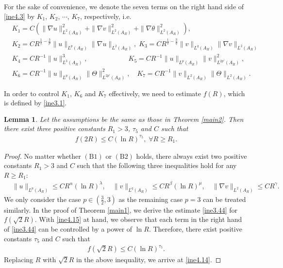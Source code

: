 \documentclass[11pt,reqno]{amsart}
\newtheorem{Lem}{Lemma}[section]
\numberwithin{Thm}{section}
\begin{document}
For the sake of convenience, we denote the seven terms on the right hand side of \eqref{ine4.3} by $K_1$, $K_2$, $\cdots$, $K_7$, respectively, i.e.
	\begin{align*}
		&K_1=C\left(\|\nabla u\|_{L^2(A_R)}^2+\|\nabla v\|_{L^2(A_R)}^2+\|\nabla \theta\|_{L^2(A_R)}^2\right),\\
        &K_2=CR^{\frac{1}{2}-\frac{3}{p}}\|u\|_{L^p(A_R)}\|\nabla u\|_{L^2(A_R)},\; K_3=CR^{\frac{1}{2}-\frac{3}{q}}\|v\|_{L^q(A_R)}\|\nabla v\|_{L^2(A_R)}\\
		&K_4=CR^{-1}\|u\|_{L^3(A_R)}^3,\quad \quad\quad \quad\quad \quad K_5=CR^{-1}\|u\|_{L^p(A_R)}\|v\|_{L^{2p'}(A_R)}^2,\\
		&K_6=CR^{-1}\|u\|_{L^p(A_R)}\|\Theta\|_{L^{2p'}(A_R)}^2,\quad K_7=CR^{-1}\|v\|_{L^2(A_R)}\|\Theta\|_{L^2(A_R)}.
	\end{align*}
	

In order to control $K_1$, $K_6$ and $K_7$ effectively, we need to estimate $f(R)$, which is defined by \eqref{ine3.1}.

\begin{Lem}\label{Lem4.3}
Let the assumptions be the same as those in {\rm Theorem \ref{main2}}. Then there exist three positive constants $R_1>3$, $\tau_5$ and $C$ such that
	\begin{align}\label{ine4.14}
		f(2R)\leq C(\ln R)^{\tau_5},\;\forall R\geq R_1.
	\end{align}
\end{Lem}
\begin{proof}
No matter whether $\mathrm{(B1)}$ or $\mathrm{(B2)}$ holds, there always exist two positive constants $R_1>3$ and $C$ such that the following three inequalities hold for any $R\geq R_1$:	
\begin{align}
&\|u\|_{L^p\left(A_R\right)}\leq CR^\alpha(\ln R)^\lambda,\quad\|v\|_{L^q\left(A_R\right)}\leq CR^\beta(\ln R)^\mu,\quad\|\nabla v\|_{L^2\left(A_R\right)}\leq CR^\gamma.\label{ine4.15}
\end{align}
We only consider the case $p\in(\frac{3}{2},3)$ as the remaining case $p=3$ can be treated similarly.	
In the proof of Theorem \ref{main1}, we derive the estimate \eqref{ine3.44} for $f\left(\sqrt{2}R\right)$.
With \eqref{ine4.15} at hand, we observe that each term in the right hand of \eqref{ine3.44} can be controlled by a power of $\ln R$.
Therefore, there exist positive constants  $\tau_5$ and $C$ such that
\begin{align*}
f\left(\sqrt{2}R\right)\leq C(\ln R)^{\tau_5}.
\end{align*}
Replacing $R$ with $\sqrt{2}R$ in the above inequality, we arrive at \eqref{ine4.14}.
\end{proof}
\end{document}
